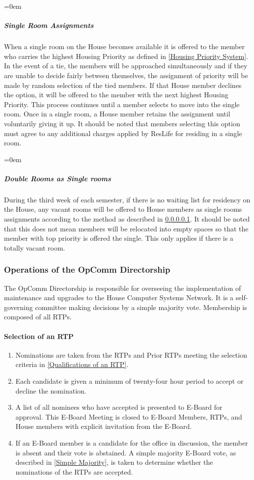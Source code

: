 \documentclass{article}
\newcommand{\asubsection}[1]{\subsubsection{#1} \label{#1}}
\newcommand{\asubsubsection}[1]{\paragraph{#1} \label{#1}}
\newcommand{\asubsubsubsection}[1]{\parindent=0em\subparagraph{#1} \label{#1}}
\begin{document}
\asubsubsubsection{Single Room Assignments}
When a single room on the House becomes available it is offered to the member who carries the highest Housing Priority as defined in \ref{Housing Priority System}.
In the event of a tie, the members will be approached simultaneously and if they are unable to decide fairly between themselves, the assignment of priority will be made by random selection of the tied members.
If that House member declines the option, it will be offered to the member with the next highest Housing Priority.
This process continues until a member selects to move into the single room.
Once in a single room, a House member retains the assignment until voluntarily giving it up.
It should be noted that members selecting this option must agree to any additional charges applied by ResLife for residing in a single room.

\asubsubsubsection{Double Rooms as Single rooms}
During the third week of each semester, if there is no waiting list for residency on the House, any vacant rooms will be offered to House members as single rooms assignments according to the method as described in \ref{Single Room Assignments}.
It should be noted that this does not mean members will be relocated into empty spaces so that the member with top priority is offered the single.
This only applies if there is a totally vacant room.

\asubsection{Operations of the OpComm Directorship}
The OpComm Directorship is responsible for overseeing the implementation of maintenance and upgrades to the House Computer Systems Network.
It is a self-governing committee making decisions by a simple majority vote.
Membership is composed of all RTPs.

\asubsubsection{Selection of an RTP}
\renewcommand{\theenumi}{\alph{enumi}} %
\begin{enumerate}
	\item Nominations are taken from the RTPs and Prior RTPs meeting the selection criteria in \ref{Qualifications of an RTP}.
	\item Each candidate is given a minimum of twenty-four hour period to accept or decline the nomination.
	\item A list of all nominees who have accepted is presented to E-Board for approval.
		This E-Board Meeting is closed to E-Board Members, RTPs, and House members with explicit invitation from the E-Board.
	\item If an E-Board member is a candidate for the office in discussion, the member is absent and their vote is abstained.
		A simple majority E-Board vote, as described in \ref{Simple Majority}, is taken to determine whether the nominations of the RTPs are accepted.
\end{enumerate}
\end{document}
